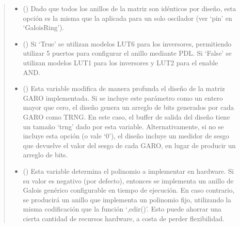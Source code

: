 \documentclass[letterpaper,10pt,english]{sphinxmanual}
\begin{document}
\begin{fulllineitems}
\begin{quote}
\begin{description}
\begin{itemize}
\item {} 
\sphinxAtStartPar
{} (\sphinxstyleliteralemphasis{\sphinxupquote{ | }}\sphinxstyleliteralemphasis{\sphinxupquote{(}}\sphinxstyleliteralemphasis{\sphinxupquote{)}}\sphinxstyleliteralemphasis{\sphinxupquote{, }}) \textendash{} Dado que todos los anillos de la matriz son idénticos por diseño, esta opción es la misma que la aplicada para un solo oscilador (ver ‘pin’ en ‘GaloisRing’).

\item {} 
\sphinxAtStartPar
{} (\sphinxstyleliteralemphasis{\sphinxupquote{, }}) \textendash{} Si ‘True’ se utilizan modelos LUT6 para los inversores, permitiendo utilizar 5 puertos para configurar el anillo mediante PDL. Si ‘False’ se utilizan modelos LUT1 para los inversores y LUT2 para el enable AND.

\item {} 
\sphinxAtStartPar
{} (\sphinxstyleliteralemphasis{\sphinxupquote{, }}) \textendash{} Esta variable modifica de manera profunda el diseño de la matriz GARO implementada. Si se incluye este parámetro como un entero mayor que cero, el diseño genera un arreglo de bits generados por cada GARO como TRNG. En este caso, el buffer de salida del diseño tiene un tamaño ‘trng’ dado por esta variable. Alternativamente, si no se incluye esta opción (o vale ‘0’), el diseño incluye un medidor de sesgo que devuelve el valor del sesgo de cada GARO, en lugar de producir un arreglo de bits.

\item {} 
\sphinxAtStartPar
{} (\sphinxstyleliteralemphasis{\sphinxupquote{, }}) \textendash{} Esta variable determina el polinomio a implementar en hardware. Si su valor es negativo (por defecto), entonces se implementa un anillo de Galois genérico configurable en tiempo de ejecución. En caso contrario, se producirá un anillo que implementa un polinomio fijo, utilizando la misma codificación que la función ‘,edir()’. Esto puede ahorrar una cierta cantidad de recursos hardware, a costa de perder flexibilidad.


\end{itemize}
\end{description}
\end{quote}
\end{fulllineitems}
\end{document}
